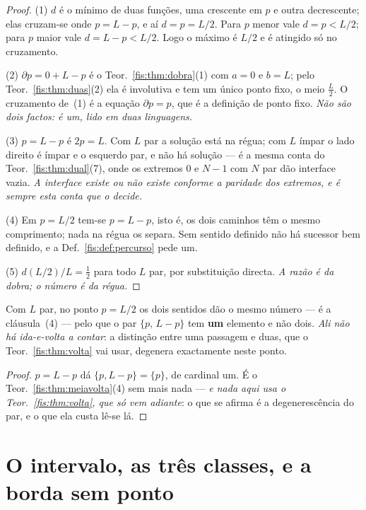 \documentclass[livro.tex]{subfiles}
\begin{document}
\begin{proof}
(1) $d$ é o mínimo de duas funções, uma crescente em $p$ e outra decrescente;
elas cruzam-se onde $p=L-p$, e aí $d=p=L/2$. Para $p$ menor vale $d=p<L/2$; para
$p$ maior vale $d=L-p<L/2$. Logo o máximo é $L/2$ e é atingido só no cruzamento.

(2) $\partial p=0+L-p$ é o Teor.~\ref{fis:thm:dobra}(1) com $a=0$ e $b=L$; pelo
Teor.~\ref{fis:thm:duas}(2) ela é involutiva e tem um único ponto fixo, o meio
$\tfrac{L}{2}$. O cruzamento de~(1) é a equação $\partial p=p$, que é a definição
de ponto fixo. \emph{Não são dois factos: é um, lido em duas linguagens.}

(3) $p=L-p$ é $2p=L$. Com $L$ par a solução está na régua; com $L$ ímpar o lado
direito é ímpar e o esquerdo par, e não há solução --- é a mesma conta do
Teor.~\ref{fis:thm:dual}(7), onde os extremos $0$ e $N-1$ com $N$ par dão
interface vazia. \emph{A interface existe ou não existe conforme a paridade dos
extremos, e é sempre esta conta que o decide.}

(4) Em $p=L/2$ tem-se $p=L-p$, isto é, os dois caminhos têm o mesmo comprimento;
nada na régua os separa. Sem sentido definido não há sucessor bem definido, e a
Def.~\ref{fis:def:percurso} pede um.

(5) $d(L/2)/L=\tfrac12$ para todo $L$ par, por substituição directa. \emph{A razão
é da dobra; o número é da régua.}
\end{proof}

\begin{corolario}\label{fis:cor:semmassa}
Com $L$ par, no ponto $p=L/2$ os dois sentidos dão o mesmo número --- é a
cláusula~(4) --- pelo que o par $\{p,\,L-p\}$ tem \textbf{um} elemento e não dois.
\emph{Ali não há ida-e-volta a contar}: a distinção entre uma passagem e duas,
que o Teor.~\ref{fis:thm:volta} vai usar, degenera exactamente neste ponto.
\end{corolario}

\begin{proof}
$p=L-p$ dá $\{p,L-p\}=\{p\}$, de cardinal um. É o
Teor.~\ref{fis:thm:meiavolta}(4) sem mais nada --- \emph{e nada aqui usa o
Teor.~\ref{fis:thm:volta}, que só vem adiante}: o que se afirma é a degenerescência
do par, e o que ela custa lê-se lá.
\end{proof}

\section{O intervalo, as três classes, e a borda sem ponto}\label{fis:rel-intervalo}
\end{document}
